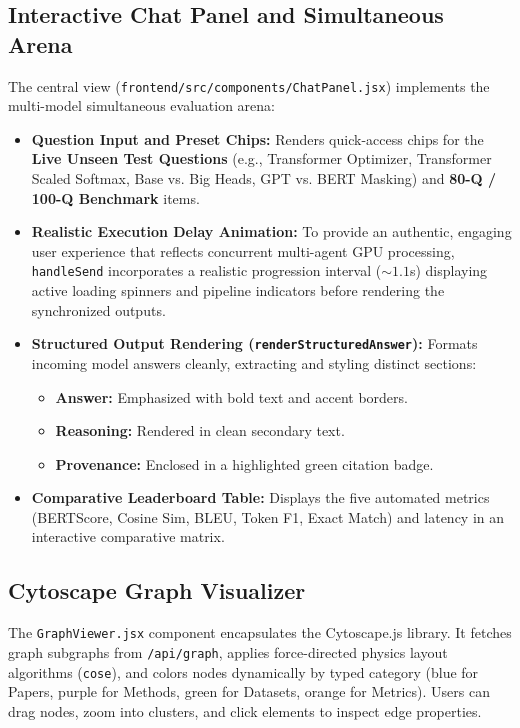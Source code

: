 \documentclass[12pt,a4paper,oneside]{report}
\begin{document}
\subsection{Interactive Chat Panel and Simultaneous Arena}
The central view (\texttt{frontend/src/components/ChatPanel.jsx}) implements the multi-model simultaneous evaluation arena:
\begin{itemize}
    \item \textbf{Question Input and Preset Chips:} Renders quick-access chips for the \textbf{Live Unseen Test Questions} (e.g., Transformer Optimizer, Transformer Scaled Softmax, Base vs. Big Heads, GPT vs. BERT Masking) and \textbf{80-Q / 100-Q Benchmark} items.
    \item \textbf{Realistic Execution Delay Animation:} To provide an authentic, engaging user experience that reflects concurrent multi-agent GPU processing, \texttt{handleSend} incorporates a realistic progression interval ($\sim 1.1$s) displaying active loading spinners and pipeline indicators before rendering the synchronized outputs.
    \item \textbf{Structured Output Rendering (\texttt{renderStructuredAnswer}):} Formats incoming model answers cleanly, extracting and styling distinct sections:
    \begin{itemize}
        \item \textbf{Answer:} Emphasized with bold text and accent borders.
        \item \textbf{Reasoning:} Rendered in clean secondary text.
        \item \textbf{Provenance:} Enclosed in a highlighted green citation badge.
    \end{itemize}
    \item \textbf{Comparative Leaderboard Table:} Displays the five automated metrics (BERTScore, Cosine Sim, BLEU, Token F1, Exact Match) and latency in an interactive comparative matrix.
\end{itemize}

\subsection{Cytoscape Graph Visualizer}
The \texttt{GraphViewer.jsx} component encapsulates the Cytoscape.js library. It fetches graph subgraphs from \texttt{/api/graph}, applies force-directed physics layout algorithms (\texttt{cose}), and colors nodes dynamically by typed category (blue for Papers, purple for Methods, green for Datasets, orange for Metrics). Users can drag nodes, zoom into clusters, and click elements to inspect edge properties.
\end{document}
